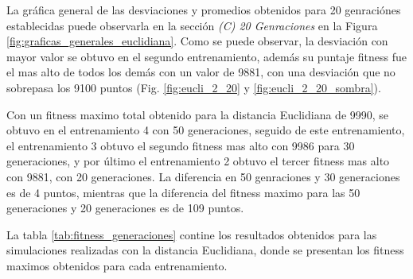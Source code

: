 \documentclass[conference]{IEEEtran}
\begin{document}
La gráfica general de las desviaciones y promedios obtenidos para 20 genraciónes establecidas puede observarla en la sección \textit{(C) 20 Genraciones} en la Figura \ref{fig:graficas_generales_euclidiana}.
Como se puede observar, la desviación con mayor valor se obtuvo en el segundo entrenamiento, además su puntaje fitness fue el mas alto de todos los demás con un valor de 9881, con una desviación que no sobrepasa los 9100 puntos (Fig. \ref{fig:eucli_2_20} y \ref{fig:eucli_2_20_sombra}).

Con un fitness maximo total obtenido para la distancia Euclidiana de 9990, se obtuvo en el entrenamiento 4 con 50 generaciones, seguido de este entrenamiento, el entrenamiento 3 obtuvo el segundo fitness mas alto con 9986 para 30 generaciones, y por último el entrenamiento 2 obtuvo el tercer fitness mas alto con 9881, con 20 generaciones. La diferencia en 50 genraciones y 30 generaciones es de 4 puntos, mientras que la diferencia del fitness maximo para las 50 generaciones y 20 generaciones es de 109 puntos. 

La tabla \ref{tab:fitness_generaciones} contine los resultados obtenidos para las simulaciones realizadas con la distancia Euclidiana, donde se presentan los fitness maximos obtenidos para cada entrenamiento.
\end{document}

